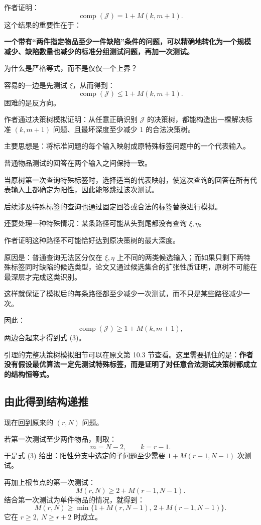 \documentclass[UTF8,11pt]{ctexart}
\begin{document}
作者证明：
\begin{equation}\boxed{\operatorname{comp}(\mathcal J)=1+M(k,m+1).}\tag{3}\end{equation}
这个结果的重要性在于：

\textbf{一个带有“两件指定物品至少一件缺陷”条件的问题，可以精确地转化为一个规模减少、缺陷数量也减少的标准分组测试问题，再加一次测试。}

为什么是严格等式，而不是仅仅一个上界？

容易的一边是先测试 $\xi$，从而得到：
\[\operatorname{comp}(\mathcal J)\le1+M(k,m+1).\]
困难的是反方向。

作者通过决策树模拟证明：从任意正确识别 $\mathcal J$ 的决策树，都能构造出一棵解决标准 $(k,m+1)$ 问题、且最坏深度至少减少 1 的合法决策树。

主要思想是：将标准问题的每个输入映射成原特殊标签问题中的一个代表输入。

普通物品测试的回答在两个输入之间保持一致。

当原树第一次查询特殊标签时，选择适当的代表映射，使这次查询的回答在所有代表输入上都确定为阳性，因此能够跳过该次测试。

后续涉及特殊标签的查询也通过固定回答或合法的标签替换进行模拟。

还要处理一种特殊情况：某条路径可能从头到尾都没有查询 $\xi,\eta$。

作者证明这种路径不可能恰好达到原决策树的最大深度。

原因是：普通查询无法区分仅在 $\xi,\eta$ 上不同的两类候选输入；而如果只剩下两特殊标签同时缺陷的候选类型，论文又通过候选集合的扩张性质证明，原树不可能在最深层才完成这类识别。

这样就保证了模拟后的每条路径都至少减少一次测试，而不只是某些路径减少一次。

因此：
\[\operatorname{comp}(\mathcal J)\ge1+M(k,m+1),\]
两边合起来才得到式 (3)。

引理的完整决策树模拟细节可以在原文第 10.3 节查看。这里需要抓住的是：\textbf{作者没有假设最优算法一定先测试特殊标签，而是证明了对任意合法测试决策树都成立的结构恒等式。}

\subsection{由此得到结构递推}
现在回到原来的 $(r,N)$ 问题。

若第一次测试至少两件物品，则取：
\[m=N-2,\qquad k=r-1.\]
于是式 (3) 给出：阳性分支中选定的子问题至少需要 $1+M(r-1,N-1)$ 次测试。

再加上根节点的第一次测试：
\[M(r,N)\ge2+M(r-1,N-1).\]
结合第一次测试为单件物品的情况，就得到：
\begin{equation}
\boxed{M(r,N)\ge\min\{1+M(r,N-1),\,2+M(r-1,N-1)\}.}
\tag{4}
\end{equation}
它在 $r\ge2,\ N\ge r+2$ 时成立。
\end{document}
